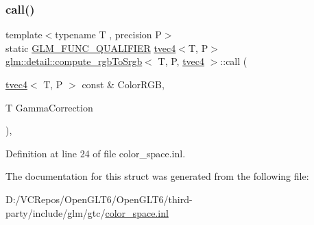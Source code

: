 \subsubsection{\texorpdfstring{call()}{call()}}
{\footnotesize\ttfamily template$<$typename T , precision P$>$ \\
static \mbox{\hyperlink{setup_8hpp_a33fdea6f91c5f834105f7415e2a64407}{G\+L\+M\+\_\+\+F\+U\+N\+C\+\_\+\+Q\+U\+A\+L\+I\+F\+I\+ER}} \mbox{\hyperlink{structglm_1_1tvec4}{tvec4}}$<$T, P$>$ \mbox{\hyperlink{structglm_1_1detail_1_1compute__rgb_to_srgb}{glm\+::detail\+::compute\+\_\+rgb\+To\+Srgb}}$<$ T, P, \mbox{\hyperlink{structglm_1_1tvec4}{tvec4}} $>$\+::call (\begin{DoxyParamCaption}\item[{\mbox{\hyperlink{structglm_1_1tvec4}{tvec4}}$<$ T, P $>$ const \&}]{Color\+R\+GB,  }\item[{T}]{Gamma\+Correction }\end{DoxyParamCaption})\hspace{0.3cm}{\ttfamily [inline]}, {\ttfamily [static]}}



Definition at line 24 of file color\+\_\+space.\+inl.



The documentation for this struct was generated from the following file\+:\begin{DoxyCompactItemize}
\item 
D\+:/\+V\+C\+Repos/\+Open\+G\+L\+T6/\+Open\+G\+L\+T6/third-\/party/include/glm/gtc/\mbox{\hyperlink{gtc_2color__space_8inl}{color\+\_\+space.\+inl}}\end{DoxyCompactItemize}
